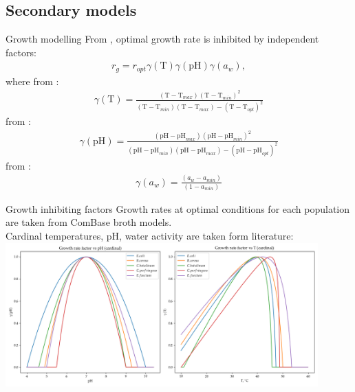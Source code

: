 \documentclass[mathserif,11pt]{beamer}
\begin{document}
\subsection{Secondary models}
\begin{frame}{Growth modelling}
From \cite{Zwietering1992}, optimal growth rate is inhibited by independent factors:
	\begin{align*}
		r_g = r_{opt} \gamma(\mathrm{\mathrm{T}}) \gamma(\mathrm{pH}) \gamma(a_w),
	\end{align*}
	where from \cite{Rosso1993}:
	\begin{align*}
	\gamma(\mathrm{T}) = \frac{(\mathrm{T} - \mathrm{T}_{max})(\mathrm{T} - \mathrm{T}_{min})^2}{(\mathrm{T} - \mathrm{T}_{min})(\mathrm{T} - \mathrm{T}_{max}) - (\mathrm{T} - \mathrm{T}_{opt})^2}
	\end{align*}
	from \cite{Akkermans2018}:
	\begin{align*}
	\gamma(\mathrm{pH}) = \frac{(\mathrm{pH} - \mathrm{pH}_{max})(\mathrm{pH} - \mathrm{pH}_{min})^2}{(\mathrm{pH} - \mathrm{pH}_{min})(\mathrm{pH} - \mathrm{pH}_{max}) - (\mathrm{pH} - \mathrm{pH}_{opt})^2}
	\end{align*}
	from \cite{McMeekin1987}:
	\begin{align*}
	\gamma(a_w) = \frac{(a_w - a_{min})}{(1 - a_{min})}
	\end{align*}
\end{frame}
\begin{frame}{Growth inhibiting factors}
Growth rates at optimal conditions for each population are taken from ComBase broth models.\\
Cardinal temperatures, pH, water activity are taken form literature:\\
\centering
	\includegraphics[width=0.9\textwidth]{Figures/inhibiting_factors_growth}
\end{frame}
\end{document}
